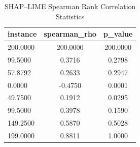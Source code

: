 \begin{table}
\centering
\caption{SHAP–LIME Spearman Rank Correlation Statistics}
\label{tab:agreement}
\begin{tabular}{lcc}
\toprule
instance & spearman_rho & p_value \\
\midrule
200.0000 & 200.0000 & 200.0000 \\
99.5000 & 0.3716 & 0.2798 \\
57.8792 & 0.2633 & 0.2947 \\
0.0000 & -0.4750 & 0.0001 \\
49.7500 & 0.1912 & 0.0295 \\
99.5000 & 0.3978 & 0.1590 \\
149.2500 & 0.5870 & 0.5028 \\
199.0000 & 0.8811 & 1.0000 \\
\bottomrule
\end{tabular}
\end{table}
